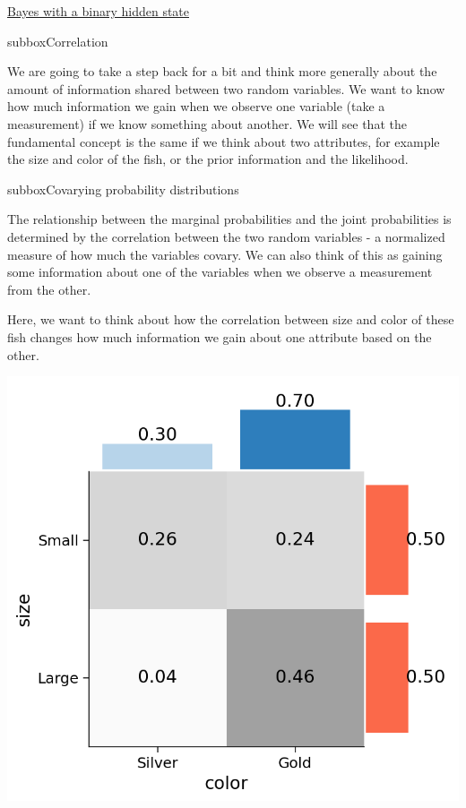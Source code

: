 \begin{textbox}{\href{https://compneuro.neuromatch.io/tutorials/W3D1_BayesianDecisions/student/W3D1_Tutorial1.html}{Bayes with a binary hidden state } }
\begin{subbox}{subbox}{Correlation}
\scriptsize

We are going to take a step back for a bit and think more generally about the amount of information shared between two random variables. We want to know how much information we gain when we observe one variable (take a measurement) if we know something about another. We will see that the fundamental concept is the same if we think about two attributes, for example the size and color of the fish, or the prior information and the likelihood.

\end{subbox}
\begin{subbox}{subbox}{Covarying probability distributions
}
\scriptsize

The relationship between the marginal probabilities and the joint probabilities is determined by the correlation between the two random variables - a normalized measure of how much the variables covary. We can also think of this as gaining some information about one of the variables when we observe a measurement from the other.  

Here, we want to think about how the correlation between size and color of these fish changes how much information we gain about one attribute based on the other. 

\centering
\includegraphics[scale=0.35]{Figures/BD/BD_Figure2.png}

\end{subbox}


\end{textbox}

